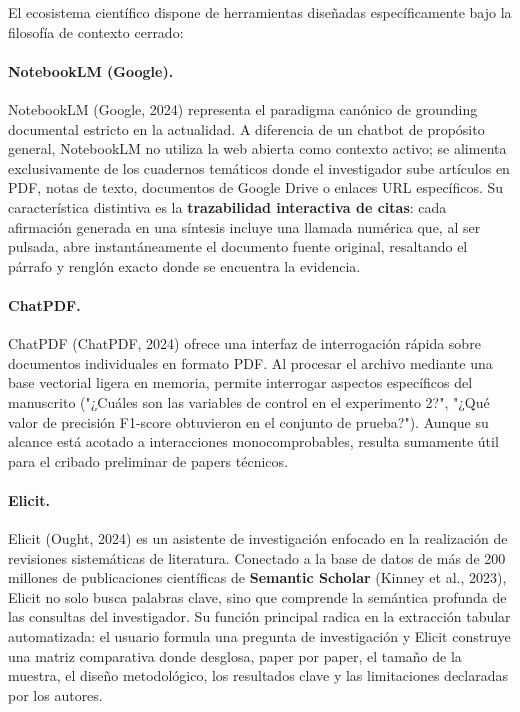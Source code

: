 El ecosistema científico dispone de herramientas diseñadas específicamente bajo la filosofía de contexto cerrado:

\paragraph{NotebookLM (Google).}
NotebookLM (Google, 2024) representa el paradigma canónico de grounding documental estricto en la actualidad. A diferencia de un chatbot de propósito general, NotebookLM no utiliza la web abierta como contexto activo; se alimenta exclusivamente de los cuadernos temáticos donde el investigador sube artículos en PDF, notas de texto, documentos de Google Drive o enlaces URL específicos. Su característica distintiva es la \textbf{trazabilidad interactiva de citas}: cada afirmación generada en una síntesis incluye una llamada numérica que, al ser pulsada, abre instantáneamente el documento fuente original, resaltando el párrafo y renglón exacto donde se encuentra la evidencia.

\paragraph{ChatPDF.}
ChatPDF (ChatPDF, 2024) ofrece una interfaz de interrogación rápida sobre documentos individuales en formato PDF. Al procesar el archivo mediante una base vectorial ligera en memoria, permite interrogar aspectos específicos del manuscrito ("¿Cuáles son las variables de control en el experimento 2?", "¿Qué valor de precisión F1-score obtuvieron en el conjunto de prueba?"). Aunque su alcance está acotado a interacciones monocomprobables, resulta sumamente útil para el cribado preliminar de papers técnicos.

\paragraph{Elicit.}
Elicit (Ought, 2024) es un asistente de investigación enfocado en la realización de revisiones sistemáticas de literatura. Conectado a la base de datos de más de 200 millones de publicaciones científicas de \textbf{Semantic Scholar} (Kinney et al., 2023), Elicit no solo busca palabras clave, sino que comprende la semántica profunda de las consultas del investigador. Su función principal radica en la extracción tabular automatizada: el usuario formula una pregunta de investigación y Elicit construye una matriz comparativa donde desglosa, paper por paper, el tamaño de la muestra, el diseño metodológico, los resultados clave y las limitaciones declaradas por los autores.

